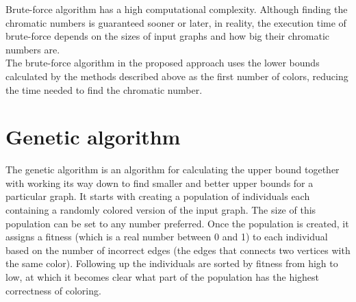 \documentclass[a4paper]{report}
\begin{document}
		Brute-force algorithm has a high computational complexity. Although finding the chromatic numbers is guaranteed sooner or later, in reality, the execution time of brute-force depends on the sizes of input graphs and how big their chromatic numbers are.\\
		
		The brute-force algorithm in the proposed approach uses the lower bounds calculated by the methods described above as the first number of colors, reducing the time needed to find the chromatic number. \\
		
			
		\section{Genetic algorithm}
		The genetic algorithm is an algorithm for calculating the upper bound together with working its way down to find smaller and better upper bounds for a particular graph. It starts with creating a population of individuals each containing a randomly colored version of the input graph. The size of this population can be set to any number preferred. Once the population is created, it assigns a fitness (which is a real number between 0 and 1) to each individual based on the number of incorrect edges (the edges that connects two vertices with the same color). Following up the individuals are sorted by fitness from high to low, at which it becomes clear what part of the population has the highest correctness of coloring.\\
		
\end{document}
